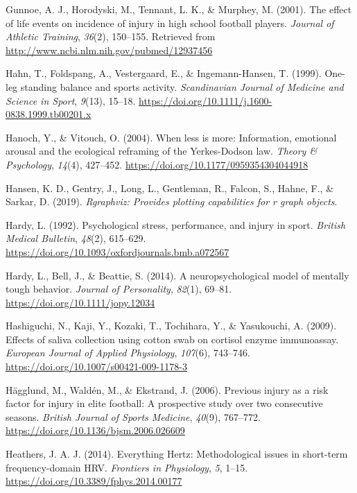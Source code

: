 \documentclass[man,floatsintext]{apa6}
\begin{document}
\leavevmode\hypertarget{ref-Gunnoe2001}{}%
Gunnoe, A. J., Horodyski, M., Tennant, L. K., \& Murphey, M. (2001). The effect of life events on incidence of injury in high school football players. \emph{Journal of Athletic Training}, \emph{36}(2), 150--155. Retrieved from \url{http://www.ncbi.nlm.nih.gov/pubmed/12937456}

\leavevmode\hypertarget{ref-Hahn1999}{}%
Hahn, T., Foldspang, A., Vestergaard, E., \& Ingemann-Hansen, T. (1999). One-leg standing balance and sports activity. \emph{Scandinavian Journal of Medicine and Science in Sport}, \emph{9}(13), 15--18. \url{https://doi.org/10.1111/j.1600-0838.1999.tb00201.x}

\leavevmode\hypertarget{ref-Hanoch2004}{}%
Hanoch, Y., \& Vitouch, O. (2004). When less is more: Information, emotional arousal and the ecological reframing of the Yerkes-Dodson law. \emph{Theory \& Psychology}, \emph{14}(4), 427--452. \url{https://doi.org/10.1177/0959354304044918}

\leavevmode\hypertarget{ref-R-Rgraphviz}{}%
Hansen, K. D., Gentry, J., Long, L., Gentleman, R., Falcon, S., Hahne, F., \& Sarkar, D. (2019). \emph{Rgraphviz: Provides plotting capabilities for r graph objects}.

\leavevmode\hypertarget{ref-Hardy1992}{}%
Hardy, L. (1992). Psychological stress, performance, and injury in sport. \emph{British Medical Bulletin}, \emph{48}(2), 615--629. \url{https://doi.org/10.1093/oxfordjournals.bmb.a072567}

\leavevmode\hypertarget{ref-Hardy2014}{}%
Hardy, L., Bell, J., \& Beattie, S. (2014). A neuropsychological model of mentally tough behavior. \emph{Journal of Personality}, \emph{82}(1), 69--81. \url{https://doi.org/10.1111/jopy.12034}

\leavevmode\hypertarget{ref-Hashiguchi2009}{}%
Hashiguchi, N., Kaji, Y., Kozaki, T., Tochihara, Y., \& Yasukouchi, A. (2009). Effects of saliva collection using cotton swab on cortisol enzyme immunoassay. \emph{European Journal of Applied Physiology}, \emph{107}(6), 743--746. \url{https://doi.org/10.1007/s00421-009-1178-3}

\leavevmode\hypertarget{ref-Hagglund2006}{}%
Hägglund, M., Waldén, M., \& Ekstrand, J. (2006). Previous injury as a risk factor for injury in elite football: A prospective study over two consecutive seasons. \emph{British Journal of Sports Medicine}, \emph{40}(9), 767--772. \url{https://doi.org/10.1136/bjsm.2006.026609}

\leavevmode\hypertarget{ref-Heathers2014}{}%
Heathers, J. A. J. (2014). Everything Hertz: Methodological issues in short-term frequency-domain HRV. \emph{Frontiers in Physiology}, \emph{5}, 1--15. \url{https://doi.org/10.3389/fphys.2014.00177}
\end{document}
